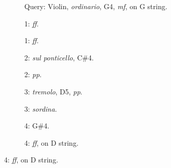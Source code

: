 \begin{figure}
        \newcommand{\scalwidth}{28.0mm}
        \newcommand{\scalheight}{22.1mm}
        \newcommand{\arrowextra}{2mm}

        \begin{subfigure}{\linewidth}
                \centering
                \caption*{Query: Violin, \emph{ordinario}, G4, \emph{mf}, on G string.}
                \label{fig:Vn-ord-G4-mf-4c}
        \end{subfigure}%

        \begin{subfigure}{0.20\textwidth}
                \centering
                \caption*{1: \emph{ff}.}
                \label{fig:Vn-ord-G4-ff-4c}
        \end{subfigure}%
        \begin{subfigure}{0.20\textwidth}
                \centering
                \caption*{1: \emph{ff}.}
                \label{fig:Vn-ord-G4-ff-4c-bis}
        \end{subfigure}%

        \begin{subfigure}{0.20\textwidth}
                \centering
                \caption*{2: \emph{sul ponticello}, C\#4.}
                \label{fig:Vn-pont-Csh4-mf-4c}
        \end{subfigure}%
        \begin{subfigure}{0.20\textwidth}
                \centering
                \caption*{2: \emph{pp}.}
                \label{fig:Vn-ord-G4-pp-4c}
        \end{subfigure}%

        \begin{subfigure}{0.20\textwidth}
                \centering
                \caption*{3: \emph{tremolo}, D5, \emph{pp}.}
                \label{fig:Vn-trem-D5-pp-4c}
        \end{subfigure}%
        \begin{subfigure}{0.20\textwidth}
                \centering
                \caption*{3: \emph{sordina}.}
                \label{fig:Vn+S-ord-G4-mf-4c}
        \end{subfigure}%

        \begin{subfigure}{0.20\textwidth}
                \centering
                \caption*{4: G\#4.}
                \label{fig:Vn-ord-Gsh4-mf-4c}
        \end{subfigure}%
        \begin{subfigure}{0.20\textwidth}
                \centering
                \caption*{4: \emph{ff}, on D string.}
                \label{fig:Vn-ord-G4-ff-3c}
        \end{subfigure}%


\end{figure}
